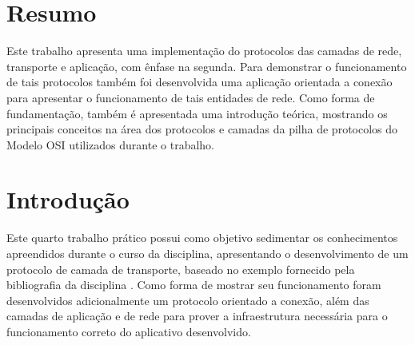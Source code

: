 \documentclass[brazil,times,12pt]{abnt}
\begin{document}





\data{\today}

\capa

\folhaderosto

\section*{Resumo}
	Este trabalho apresenta uma implementação do protocolos das camadas de
	rede, transporte e aplicação, com ênfase na segunda. Para demonstrar o
	funcionamento de tais protocolos também foi desenvolvida uma aplicação
	orientada a conexão para apresentar o funcionamento de tais entidades de rede.
	Como forma de fundamentação, também é apresentada uma introdução teórica,
	mostrando os principais conceitos na área dos protocolos e camadas da pilha de
	protocolos do Modelo OSI utilizados durante o trabalho.	

\section*{Introdução}	
	Este quarto trabalho prático possui como objetivo sedimentar os conhecimentos
	apreendidos durante o curso da disciplina, apresentando o desenvolvimento de um
	protocolo de camada de transporte, baseado no exemplo fornecido pela
	bibliografia da disciplina \cite{tanenbaum:redes-computadores}. Como forma de
	mostrar seu funcionamento foram desenvolvidos adicionalmente um protocolo
	orientado a conexão, além das camadas de aplicação e de rede para prover a
	infraestrutura necessária para o funcionamento correto do aplicativo
	desenvolvido.
	
\end{document}
